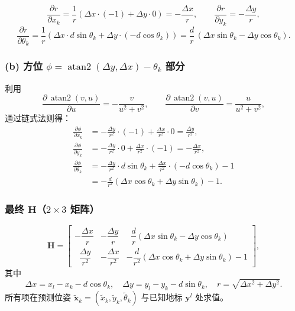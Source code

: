 \documentclass[12pt]{article}
\newcommand{\atantwo}{\operatorname{atan2}}
\begin{document}
\[
\frac{\partial r}{\partial x_k}=\frac{1}{r}\!\left(\Delta x\cdot(-1)+\Delta y\cdot 0\right)=-\frac{\Delta x}{r},
\qquad
\frac{\partial r}{\partial y_k}=-\frac{\Delta y}{r},
\]
\[
\frac{\partial r}{\partial \theta_k}
=\frac{1}{r}\!\left(\Delta x\cdot d\sin\theta_k+\Delta y\cdot(-d\cos\theta_k)\right)
=\frac{d}{r}\,(\Delta x\sin\theta_k-\Delta y\cos\theta_k).
\]

\subsubsection*{(b) 方位 $\phi=\atantwo(\Delta y,\Delta x)-\theta_k$ 部分}

利用
\[
\frac{\partial\,\atantwo(v,u)}{\partial u}=-\frac{v}{u^2+v^2},\qquad
\frac{\partial\,\atantwo(v,u)}{\partial v}=\frac{u}{u^2+v^2},
\]
通过链式法则得：
\begin{align*}
\frac{\partial\phi}{\partial x_k}
&=-\frac{\Delta y}{r^2}\cdot(-1)+\frac{\Delta x}{r^2}\cdot 0
=\frac{\Delta y}{r^2},\\[6pt]
\frac{\partial\phi}{\partial y_k}
&=-\frac{\Delta y}{r^2}\cdot 0+\frac{\Delta x}{r^2}\cdot(-1)
=-\frac{\Delta x}{r^2},\\[6pt]
\frac{\partial\phi}{\partial\theta_k}
&=-\frac{\Delta y}{r^2}\cdot d\sin\theta_k
+\frac{\Delta x}{r^2}\cdot(-d\cos\theta_k)-1\\[4pt]
&=-\frac{d}{r^2}\!\left(\Delta x\cos\theta_k+\Delta y\sin\theta_k\right)-1.
\end{align*}

\subsubsection*{最终 $\mathbf{H}$（$2\times 3$ 矩阵）}

\[
\boxed{\;
\mathbf{H}=
\begin{bmatrix}
-\dfrac{\Delta x}{r} &
-\dfrac{\Delta y}{r} &
\;\;\dfrac{d}{r}\!\left(\Delta x\sin\theta_k-\Delta y\cos\theta_k\right)\\[14pt]
\;\;\dfrac{\Delta y}{r^2} &
-\dfrac{\Delta x}{r^2} &
-\dfrac{d}{r^2}\!\left(\Delta x\cos\theta_k+\Delta y\sin\theta_k\right)-1
\end{bmatrix},
\;}
\]
其中
\[
\Delta x=x_l-x_k-d\cos\theta_k,\quad
\Delta y=y_l-y_k-d\sin\theta_k,\quad
r=\sqrt{\Delta x^2+\Delta y^2}.
\]
所有项在预测位姿 $\tilde{\mathbf{x}}_k=(\tilde{x}_k,\tilde{y}_k,\tilde{\theta}_k)$ 与已知地标 $\mathbf{y}^l$ 处求值。

\newpage
\end{document}
